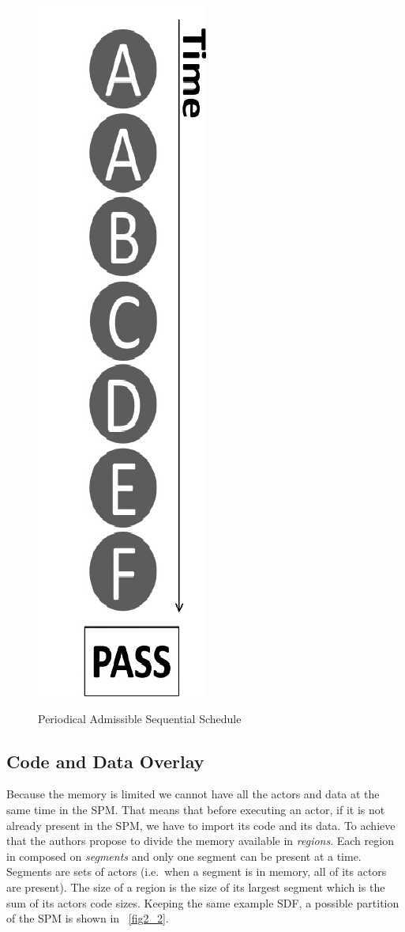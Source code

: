 \documentclass{article}
\begin{document}
\begin{figure}
\caption{Periodical Admissible Sequential Schedule}
\centering
\includegraphics[scale=0.175]{fig1_2}
\label{fig1_2}
\end{figure}

\subsection{Code and Data Overlay}
Because the memory is limited we cannot have all the actors and data at the same time in the SPM\@.
That means that before executing an actor, if it is not already present in the SPM\@, we have to import its code and its data.
To achieve that the authors propose to divide the memory available in \textit{regions}.
Each region in composed on \textit{segments} and only one segment can be present at a time.
Segments are sets of actors (i.e.\ when a segment is in memory, all of its actors are present).
The size of a region is the size of its largest segment which is the sum of its actors code sizes.
Keeping the same example SDF, a possible partition of the SPM is shown in \figurename~\ref{fig2_2}.
\end{document}
